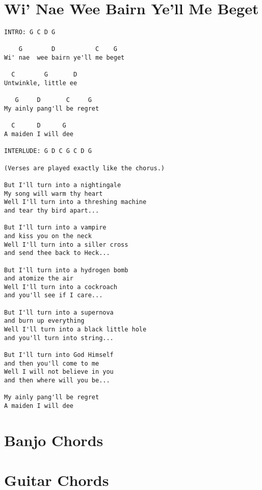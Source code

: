 \documentclass[leqno]{memoir}
\begin{document}
\chapter{Wi' Nae Wee Bairn Ye'll Me Beget}
\begin{verbatim}
INTRO: G C D G

    G        D           C    G
Wi' nae  wee bairn ye'll me beget

  C        G       D
Untwinkle, little ee

   G     D       C     G
My ainly pang'll be regret

  C      D      G
A maiden I will dee

INTERLUDE: G D C G C D G

(Verses are played exactly like the chorus.)

But I'll turn into a nightingale
My song will warm thy heart
Well I'll turn into a threshing machine
and tear thy bird apart...

But I'll turn into a vampire
and kiss you on the neck
Well I'll turn into a siller cross
and send thee back to Heck...

But I'll turn into a hydrogen bomb
and atomize the air
Well I'll turn into a cockroach
and you'll see if I care...

But I'll turn into a supernova
and burn up everything
Well I'll turn into a black little hole
and you'll turn into string...

But I'll turn into God Himself
and then you'll come to me
Well I will not believe in you
and then where will you be...

My ainly pang'll be regret
A maiden I will dee
\end{verbatim}
%
%
%
%

\chapter{Banjo Chords}

\newpage
\chapter{Guitar Chords}

\end{document}

